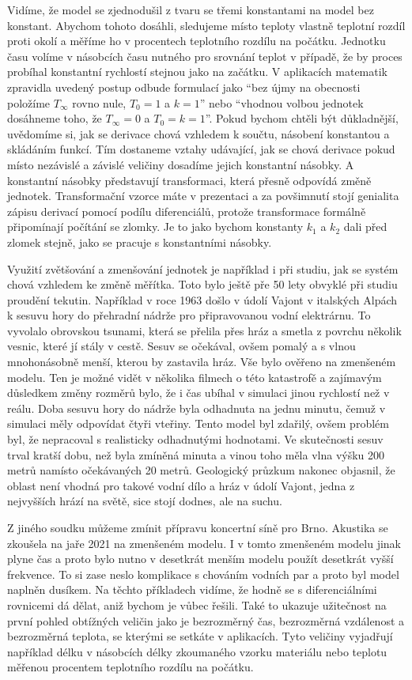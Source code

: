\documentclass[12pt]{article}
\begin{document}
Vidíme, že model se zjednodušil z tvaru se třemi konstantami na model bez konstant. Abychom tohoto dosáhli, sledujeme místo teploty vlastně teplotní rozdíl proti okolí a měříme ho v procentech teplotního rozdílu na počátku. Jednotku času volíme v násobcích času nutného pro srovnání teplot v případě, že by proces probíhal konstantní rychlostí stejnou jako na začátku. V aplikacích matematik zpravidla uvedený postup odbude formulací jako ``bez újmy na obecnosti položíme $T_\infty$ rovno nule, $T_0=1$ a $k=1$'' nebo ``vhodnou volbou jednotek dosáhneme toho, že $T_\infty=0$ a $T_0=k=1$''. Pokud bychom chtěli být důkladnější, uvědomíme si, jak se derivace chová vzhledem k součtu, násobení konstantou a skládáním funkcí. Tím dostaneme vztahy udávající, jak se chová derivace pokud místo nezávislé a závislé veličiny dosadíme jejich konstantní násobky. A konstantní násobky představují transformaci, která přesně odpovídá změně jednotek. Transformační vzorce máte v prezentaci a za povšimnutí stojí genialita zápisu derivací pomocí podílu diferenciálů, protože transformace formálně připomínají počítání se zlomky. Je to jako bychom konstanty $k_1$ a $k_2$ dali před zlomek stejně, jako se pracuje s konstantními násobky.

Využití zvětšování a zmenšování jednotek je například i při studiu, jak se systém chová vzhledem ke změně měřítka. Toto bylo ještě pře 50 lety obvyklé při studiu proudění tekutin. Například v  roce 1963 došlo v údolí Vajont v italských Alpách k sesuvu hory do přehradní nádrže pro připravovanou vodní elektrárnu. To vyvolalo obrovskou tsunami, která se přelila přes hráz a smetla z povrchu několik vesnic, které jí stály v cestě. Sesuv se očekával, ovšem pomalý a s vlnou mnohonásobně menší, kterou by zastavila hráz. Vše bylo ověřeno na zmenšeném modelu. Ten je možné vidět v několika filmech o této katastrofě a zajímavým důsledkem změny rozměrů bylo, že i čas ubíhal v simulaci jinou rychlostí než v reálu. Doba sesuvu hory do nádrže byla odhadnuta na jednu minutu, čemuž v simulaci měly odpovídat čtyři vteřiny. Tento model byl zdařilý, ovšem problém byl, že nepracoval s realisticky odhadnutými hodnotami. Ve skutečnosti sesuv trval kratší dobu, než byla zmíněná minuta a vinou toho měla vlna výšku 200 metrů namísto očekávaných 20 metrů. Geologický průzkum nakonec objasnil, že oblast není vhodná pro takové vodní dílo a hráz v údolí Vajont, jedna z nejvyšších hrází na světě, sice stojí dodnes, ale na suchu.

Z jiného soudku můžeme zmínit přípravu koncertní síně pro Brno. Akustika se zkoušela na jaře 2021 na zmenšeném modelu. I v tomto zmenšeném modelu jinak plyne čas a proto bylo nutno v desetkrát menším modelu použít desetkrát vyšší frekvence. To si zase neslo komplikace s chováním vodních par a proto byl model naplněn dusíkem. Na těchto příkladech vidíme, že hodně se s diferenciálními rovnicemi dá dělat, aniž bychom je vůbec řešili. Také to ukazuje užitečnost na první pohled obtížných veličin jako je bezrozměrný čas, bezrozměrná vzdálenost a bezrozměrná teplota, se kterými se setkáte v aplikacích. Tyto veličiny vyjadřují například délku v násobcích délky zkoumaného vzorku materiálu nebo teplotu měřenou procentem teplotního rozdílu na počátku. 
\end{document}
